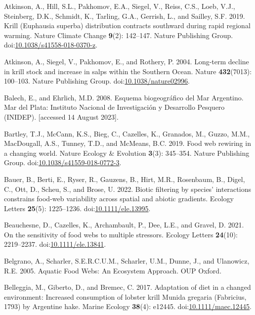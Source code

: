 \documentclass[
]{article}
\newlength{\cslhangindent}
\newenvironment{CSLReferences}[2] %
 {\begin{list}{}{%
  \setlength{\itemindent}{0pt}
  \setlength{\leftmargin}{0pt}
  \setlength{\parsep}{0pt}
  \ifodd #1
   \setlength{\leftmargin}{\cslhangindent}
   \setlength{\itemindent}{-1\cslhangindent}
  \fi
  \setlength{\itemsep}{#2\baselineskip}}}
 {\end{list}}
\begin{document}
\begin{CSLReferences}{1}{0}
Atkinson, A., Hill, S.L., Pakhomov, E.A., Siegel, V., Reiss, C.S., Loeb,
V.J., Steinberg, D.K., Schmidt, K., Tarling, G.A., Gerrish, L., and
Sailley, S.F. 2019. Krill ({Euphausia} superba) distribution contracts
southward during rapid regional warming. Nature Climate Change
\textbf{9}(2): 142--147. Nature Publishing Group.
doi:\href{https://doi.org/10.1038/s41558-018-0370-z}{10.1038/s41558-018-0370-z}.

Atkinson, A., Siegel, V., Pakhomov, E., and Rothery, P. 2004. Long-term
decline in krill stock and increase in salps within the {Southern
Ocean}. Nature \textbf{432}(7013): 100--103. Nature Publishing Group.
doi:\href{https://doi.org/10.1038/nature02996}{10.1038/nature02996}.

Balech, E., and Ehrlich, M.D. 2008. {Esquema biogeogr{á}fico del Mar
Argentino}. Mar del Plata: Instituto Nacional de Investigaci{ó}n y
Desarrollo Pesquero (INIDEP). {[}accessed 14 August 2023{]}.

Bartley, T.J., McCann, K.S., Bieg, C., Cazelles, K., Granados, M.,
Guzzo, M.M., MacDougall, A.S., Tunney, T.D., and McMeans, B.C. 2019.
Food web rewiring in a changing world. Nature Ecology \& Evolution
\textbf{3}(3): 345--354. Nature Publishing Group.
doi:\href{https://doi.org/10.1038/s41559-018-0772-3}{10.1038/s41559-018-0772-3}.

Bauer, B., Berti, E., Ryser, R., Gauzens, B., Hirt, M.R., Rosenbaum, B.,
Digel, C., Ott, D., Scheu, S., and Brose, U. 2022. Biotic filtering by
species' interactions constrains food-web variability across spatial and
abiotic gradients. Ecology Letters \textbf{25}(5): 1225--1236.
doi:\href{https://doi.org/10.1111/ele.13995}{10.1111/ele.13995}.

Beauchesne, D., Cazelles, K., Archambault, P., Dee, L.E., and Gravel, D.
2021. On the sensitivity of food webs to multiple stressors. Ecology
Letters \textbf{24}(10): 2219--2237.
doi:\href{https://doi.org/10.1111/ele.13841}{10.1111/ele.13841}.

Belgrano, A., Scharler, S.E.R.C.U.M., Scharler, U.M., Dunne, J., and
Ulanowicz, R.E. 2005. Aquatic {Food Webs}: {An Ecosystem Approach}. OUP
Oxford.

Belleggia, M., Giberto, D., and Bremec, C. 2017. Adaptation of diet in a
changed environment: {Increased} consumption of lobster krill {Munida}
gregaria ({Fabricius}, 1793) by {Argentine} hake. Marine Ecology
\textbf{38}(4): e12445.
doi:\href{https://doi.org/10.1111/maec.12445}{10.1111/maec.12445}.


\end{CSLReferences}
\end{document}
